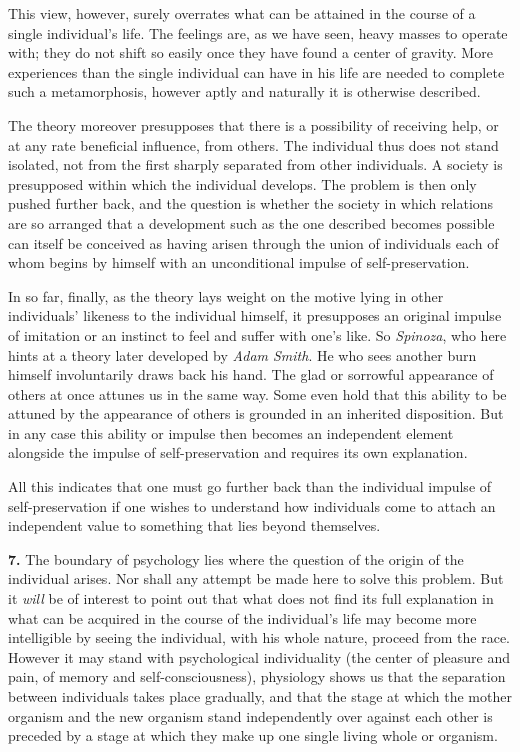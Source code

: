\documentclass[12pt,a4paper]{book}
\newcommand{\opage}[1]{\marginnote{\footnotesize\textit{[#1]}}}
\begin{document}
This view, however, surely overrates what can be attained in the course
of a single individual's life. The feelings are, as we have seen, heavy
masses to operate with; they do not shift so easily once they have
found a center of gravity. More experiences than the single individual
can have in his life are needed to complete such a metamorphosis,
however aptly and naturally it is otherwise described.


\opage{296}The theory moreover presupposes that there is a possibility of
receiving help, or at any rate beneficial influence, from others. The
individual thus does not stand isolated, not from the first sharply
separated from other individuals. A society is presupposed within which
the individual develops. The problem is then only pushed further back,
and the question is whether the society in which relations are so
arranged that a development such as the one described becomes possible
can itself be conceived as having arisen through the union of
individuals each of whom begins by himself with an unconditional impulse
of self-preservation.

In so far, finally, as the theory lays weight on the motive lying in
other individuals' likeness to the individual himself, it presupposes an
original impulse of imitation or an instinct to feel and suffer with
one's like. So \emph{Spinoza}, who here hints at a theory later
developed by \emph{Adam Smith}. He who sees another burn himself
involuntarily draws back his hand. The glad or sorrowful appearance of
others at once attunes us in the same way. Some even hold that this
ability to be attuned by the appearance of others is grounded in an
inherited disposition. But in any case this ability or impulse then
becomes an independent element alongside the impulse of
self-preservation and requires its own explanation.

All this indicates that one must go further back than the individual
impulse of self-preservation if one wishes to understand how individuals
come to attach an independent value to something that lies beyond
themselves.

\textbf{7.} The boundary of psychology lies where the question of the
origin of the individual arises. Nor shall any attempt be made here to
solve this problem. But it \emph{will} be of interest to point out that
what does not find its full explanation in what can be acquired in the
course of the individual's life may become more intelligible by seeing
the individual, with his whole nature, proceed from the race. However
it may stand with psychological individuality (the center of pleasure
and pain, of memory and self-consciousness), physiology shows us that
the separation between individuals takes place gradually, and that the
stage at which the mother organism and the new organism stand
independently over against each other is preceded by a stage at which
they make up one single living whole or organism.
\end{document}
